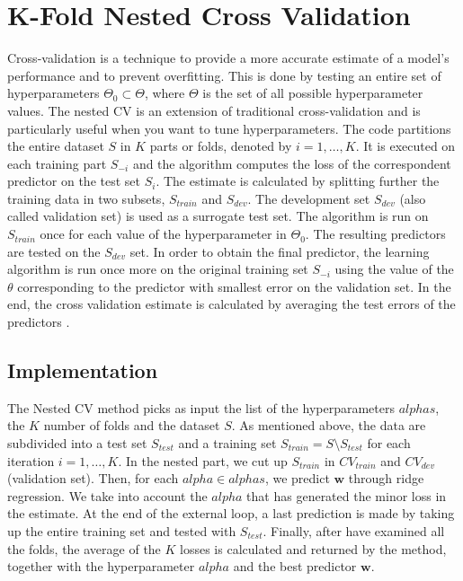 \documentclass{article}
\begin{document}
\section{K-Fold Nested Cross Validation}
Cross-validation is a technique to provide a more accurate estimate of a model's performance and to prevent overfitting. This is done by testing an entire set of hyperparameters $\Theta_0 \subset \Theta$, where $\Theta$ is the set of all possible hyperparameter values. The nested CV is an extension of traditional cross-validation and is particularly useful when you want to tune hyperparameters.
The code partitions the entire dataset $S$ in $K$ parts or folds, denoted by $i = 1,\dots,K$. It is executed on each training part $S_{-i}$ and the algorithm computes the loss of the correspondent predictor on the test set $S_i$. The estimate is calculated by splitting further the training data in two subsets, $S_{train}$ and $S_{dev}$. The development set $S_{dev}$ (also called validation set) is used as a surrogate test set. The algorithm is run on $S_{train}$ once for each value of the hyperparameter in $\Theta_0$. The resulting predictors are tested on the $S_{dev}$ set. In order to obtain the final predictor, the learning algorithm is run once more on the original training set $S_{-i}$ using the value of the $\theta$ corresponding to the predictor with smallest error on the validation set. In the end, the cross validation estimate is calculated by averaging the test errors of the predictors \cite{profcv}. \newline

\subsection{Implementation}
The Nested CV method picks as input the list of the hyperparameters $alphas$, the $K$ number of folds and the dataset $S$. As mentioned above, the data are subdivided into a test set $S_{test}$ and a training set $S_{train} = S \setminus S_{test}$ for each iteration $i = 1, \dots, K$. In the nested part, we cut up $S_{train}$ in $CV_{train}$ and $CV_{dev}$ (validation set). Then, for each $alpha \in alphas$, we predict $\boldsymbol{w}$ through ridge regression. We take into account the $alpha$ that has generated the minor loss in the estimate. At the end of the external loop, a last prediction is made by taking up the entire training set and tested with $S_{test}$.
Finally, after have examined all the folds, the average of the $K$ losses is calculated and returned by the method, together with the hyperparameter $alpha$ and the best predictor $\boldsymbol{w}$. 
\end{document}
